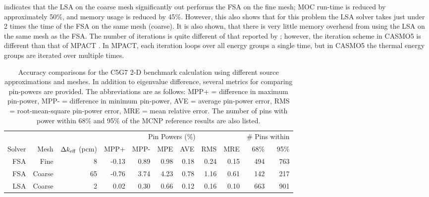 {{{       indicates that the \ac{LSA} on the coarse mesh significantly out performs the \ac{FSA} on the fine mesh;
      \ac{MOC} run-time is reduced by approximately 50\%, and memory usage is reduced by 45\%.
      However, this also shows that for this problem the \ac{LSA} solver takes just under 2 times the time of the \ac{FSA} on the same mesh (coarse).
      It is also shown, that there is very little memory overhead from using the \ac{LSA} on the same mesh as the \ac{FSA}.
      The number of iterations is quite different of that reported by \citet{Ferrer2016}; however, the iteration scheme in CASMO5 is different than that of MPACT \cite{FerrerPersoanlCommunications2018}.
      In MPACT, each iteration loops over all energy groups a single time, but in CASMO5 the thermal energy groups are iterated over multiple times.

      \begin{table}[htbp]
        \centering
        \caption{
          Accuracy comparisons for the C5G7 2-D benchmark calculation using different source approximations and meshes.
          In addition to eigenvalue difference, several metrics for comparing pin-powers are provided.
          The abbreviations are as follows:
            MPP+ = difference in maximum pin-power, MPP- = difference in minimum pin-power,
            AVE = average pin-power error, RMS = root-mean-square pin-power error,
            MRE = mean relative error.
          The number of pins with power within 68\% and 95\% of the MCNP reference results are also listed.
        }
        \label{tab:LSMOC:C5G7:Results}
        \begin{tabular}{rrrrrrrrrrr}\toprule
                 &      &                     & \multicolumn{6}{c}{Pin Powers (\%)} & \multicolumn{2}{c}{\# Pins within}\\
          Solver & Mesh & $\Delta k_{\text{eff}}$ (pcm) & MPP+ & MPP- & MPE & AVE & RMS & MRE & 68\% & 95\%\\\midrule
          FSA    & Fine    & 8                & -0.13 & 0.89 & 0.98 & 0.18 & 0.24 & 0.15 & 494 & 763\\
          FSA    & Coarse  & 65               & -0.76 & 3.74 & 4.23 & 0.78 & 1.16 & 0.61 & 142 & 217\\
          LSA    & Coarse  & 2                &  0.02 & 0.30 & 0.66 & 0.12 & 0.16 & 0.10 & 663 & 901\\\bottomrule
        \end{tabular}
      \end{table}

}}}

